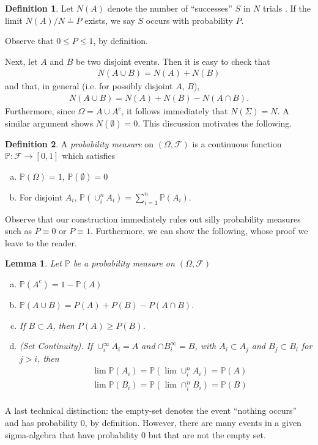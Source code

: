 \documentclass[12pt]{article}
\newcommand{\filter}{\mathcal{F}}
\newcommand{\prob}{\mathbb{P}}
\theoremstyle{plain}
\newtheorem{lemma}[theorem]{Lemma}
\theoremstyle{definition}
\newtheorem*{definition}{Definition}
\theoremstyle{remark}
\numberwithin{equation}{section}  %
\begin{document}
\begin{definition}
Let $N(A)$ denote the number of ``successes'' $S$ in $N$ trials . If the
limit $N(A)/N \doteq P$ exists, we say $S$ occurs with probability $P$. 
\end{definition}
Observe that $ 0 \le P \le 1$, by definition. 

Next, let $A$ and $B$ be two disjoint events. Then 
it is easy to check that
\begin{align*}
N(A \cup B) = N(A) + N(B)
\end{align*}
and that, in general (i.e. for possibly disjoint $A$, $B$),
\begin{align*}
N(A \cup B) = N(A) + N(B) - N(A \cap B).
\end{align*}
Furthermore, since $\Omega = A \cup A^c$, it follows immediately
that $N(\Sigma) = N$. A similar argument shows $N(\emptyset) = 0$.
This discussion motivates the following.
\begin{definition}
A \emph{probability measure} on $(\Omega, \filter)$ is a continuous function
$\prob:
\filter \to [0,1]$ which satisfies 
\begin{enumerate}[a)]
	\item
$\prob(\Omega) = 1$, $\prob(\emptyset) = 0$
\item
For disjoint $A_i$, $\prob(\cup_i^n A_i) = \sum_{i = 1}^n \prob(A_i)$.
\end{enumerate}
\end{definition}
Observe that our construction immediately rules out silly probability
measures such as $P \equiv 0$ or $P \equiv 1$. Furthermore,
we can show the following, whose proof we leave to the reader.
\begin{lemma}
Let $\prob$ be a probability measure on $(\Omega, \filter)$
\begin{enumerate}[a)]
\item $\prob(A^c) = 1 - \prob(A)$
\item $\prob(A \cup B) = P(A) + P(B) - P(A \cap B)$.
\item If $B \subset A$, then $P(A) \ge P(B)$.
\item \emph{(Set Continuity)}.
If $\cup_i^\infty A_i = A$ and
$\cap B_i^\infty = B$, with $A_i \subset A_j$ and $B_j \subset B_i$ for $j > i$,
then
\begin{align*}
& \lim \prob(A_i) = \prob(\lim \cup_i^n A_i) = \prob(A) \\
& \lim \prob(B_i) = \prob(\lim \cap_i^n B_i) = \prob(B) \\
\end{align*}
\end{enumerate}
\end{lemma}
A last technical distinction: the empty-set denotes the event ``nothing
occurs'' and has probability $0$, by definition. However, there are many
events in a given sigma-algebra that have probability $0$ but that are not the
empty set. 
\end{document}

